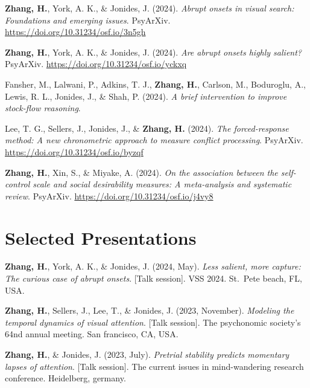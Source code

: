 \documentclass[11pt,a4paper,]{awesome-cv}
\begin{document}
\hypertarget{bibliography}{}
\leavevmode{}%
\textbf{Zhang, H.}, York, A. K., \& Jonides, J. (2024). \emph{Abrupt
onsets in visual search: Foundations and emerging issues}. PsyArXiv.
\url{https://doi.org/10.31234/osf.io/3n5gh}

\leavevmode{}%
\textbf{Zhang, H.}, York, A. K., \& Jonides, J. (2024). \emph{Are abrupt
onsets highly salient?} PsyArXiv.
\url{https://doi.org/10.31234/osf.io/yckxq}

\leavevmode{}%
Fansher, M., Lalwani, P., Adkins, T. J., \textbf{Zhang, H.}, Carlson,
M., Boduroglu, A., Lewis, R. L., Jonides, J., \& Shah, P. (2024).
\emph{A brief intervention to improve stock-flow reasoning}.

\leavevmode{}%
Lee, T. G., Sellers, J., Jonides, J., \& \textbf{Zhang, H.} (2024).
\emph{The forced-response method: A new chronometric approach to measure
conflict processing}. PsyArXiv.
\url{https://doi.org/10.31234/osf.io/byzqf}

\leavevmode{}%
\textbf{Zhang, H.}, Xin, S., \& Miyake, A. (2024). \emph{On the
association between the self-control scale and social desirability
measures: A meta-analysis and systematic review}. PsyArXiv.
\url{https://doi.org/10.31234/osf.io/j4vy8}

\hypertarget{selected-presentations}{%
\section{Selected Presentations}\label{selected-presentations}}

\hypertarget{bibliography}{}
\leavevmode{}%
\textbf{Zhang, H.}, York, A. K., \& Jonides, J. (2024, May). \emph{Less
salient, more capture: The curious case of abrupt onsets}. {[}Talk
session{]}. VSS 2024. St.~Pete beach, FL, USA.

\leavevmode{}%
\textbf{Zhang, H.}, Sellers, J., Lee, T., \& Jonides, J. (2023,
November). \emph{Modeling the temporal dynamics of visual attention}.
{[}Talk session{]}. The psychonomic society's 64nd annual meeting. San
francisco, CA, USA.

\leavevmode{}%
\textbf{Zhang, H.}, \& Jonides, J. (2023, July). \emph{Pretrial
stability predicts momentary lapses of attention}. {[}Talk session{]}.
The current issues in mind-wandering research conference. Heidelberg,
germany.
\end{document}
